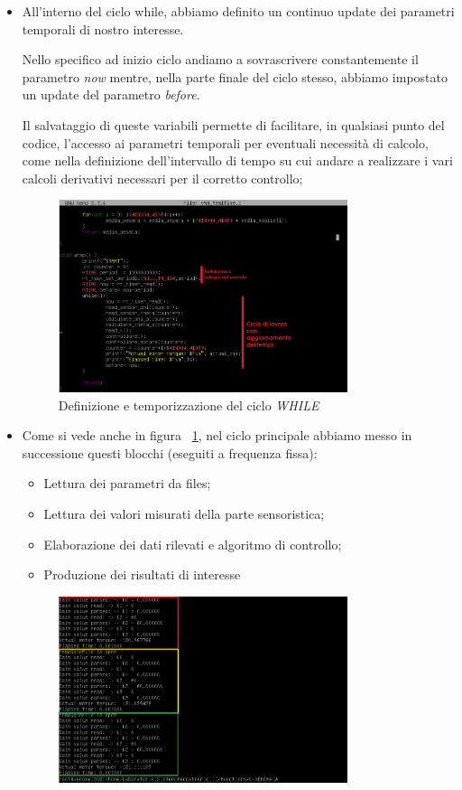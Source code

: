 \begin{itemize}
\begin{itemize}
		\item All'interno del ciclo while, abbiamo definito un continuo update dei parametri temporali di nostro interesse.
		
		Nello specifico ad inizio ciclo andiamo a sovrascrivere constantemente il parametro \textit{now} mentre, nella parte finale del ciclo stesso, abbiamo impostato un update del parametro \textit{before}.
		
		Il salvataggio di queste variabili permette di facilitare, in qualsiasi punto del codice, l'accesso ai parametri temporali per eventuali necessità di calcolo, come nella definizione dell'intervallo di tempo su cui andare a realizzare i vari calcoli derivativi necessari per il corretto controllo;
		\begin{figure}[H]
			\centering   	
			\includegraphics[width=0.8\textwidth]{Immagini/xenomai_nano.png}
			\caption{Definizione e temporizzazione del ciclo \textit{WHILE}}
			\label{fig:xenomai_nano}
		\end{figure}
		\item Come si vede anche in figura ~\ref{fig:xenomai_nano}, nel ciclo principale abbiamo messo in successione questi blocchi (eseguiti a frequenza fissa): 
		\begin{itemize}
			\item Lettura dei parametri da files;
			\item Lettura dei valori misurati della parte sensoristica;
			\item Elaborazione dei dati rilevati e algoritmo di controllo;
			\item Produzione dei risultati di interesse
		\end{itemize}
		\begin{figure}[H]
			\centering   	
			\includegraphics[width=0.8\textwidth]{Immagini/xenomai_execution.png}

\end{figure}
\end{itemize}
\end{itemize}
